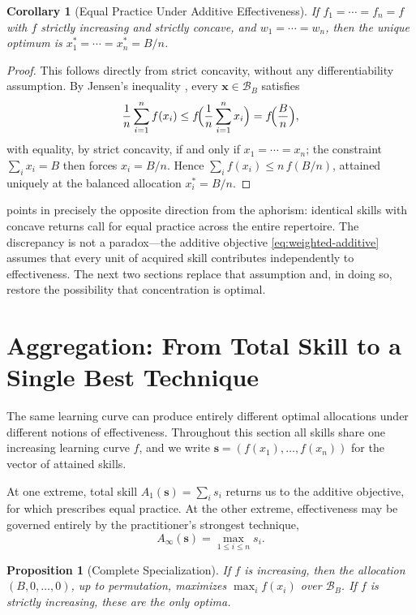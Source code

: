 \documentclass[11pt]{article}
\newtheorem{proposition}[theorem]{Proposition}
\newtheorem{corollary}[theorem]{Corollary}
\theoremstyle{definition}
\theoremstyle{remark}
\newcommand{\vx}{\mathbf{x}}
\newcommand{\vs}{\mathbf{s}}
\newcommand{\simplex}{\mathcal{B}}
\begin{document}
\begin{corollary}[Equal Practice Under Additive Effectiveness]
\label{cor:equal-practice}
If \(f_1=\cdots=f_n=f\) with \(f\) strictly increasing and strictly
concave, and \(w_1=\cdots=w_n\), then the unique optimum is
\(x_1^*=\cdots=x_n^*=B/n\).
\end{corollary}

\begin{proof}
This follows directly from strict concavity, without any
differentiability assumption.  By Jensen's inequality
\citep[\S3.1]{hardy1952inequalities}, every \(\vx\in\simplex_B\)
satisfies
\[
    \frac1n\sum_{i=1}^n f(x_i)
    \leq
    f\!\Bigl(\frac1n\sum_{i=1}^n x_i\Bigr)
    =
    f\!\Bigl(\frac{B}{n}\Bigr),
\]
with equality, by strict concavity, if and only if \(x_1=\cdots=x_n\);
the constraint \(\sum_i x_i=B\) then forces \(x_i=B/n\). Hence
\(\sum_i f(x_i)\leq n\,f(B/n)\), attained uniquely at the balanced
allocation \(x_i^*=B/n\).
\end{proof}

 points in precisely the opposite direction
from the aphorism: identical skills with concave returns call for
equal practice across the entire repertoire.  The discrepancy is not a
paradox---the additive objective \eqref{eq:weighted-additive} assumes
that every unit of acquired skill contributes independently to
effectiveness.  The next two sections replace that assumption and, in
doing so, restore the possibility that concentration is optimal.


\section{Aggregation: From Total Skill to a Single Best Technique}
\label{sec:aggregation}

The same learning curve can produce entirely different optimal
allocations under different notions of effectiveness.  Throughout this
section all skills share one increasing learning curve \(f\), and we
write \(\vs=(f(x_1),\ldots,f(x_n))\) for the vector of attained
skills.

At one extreme, total skill \(A_1(\vs)=\sum_i s_i\) returns us to the
additive objective, for which  prescribes
equal practice. At the other extreme, effectiveness may be governed
entirely by the practitioner's strongest technique,
\[
    A_\infty(\vs)=\max_{1\leq i\leq n} s_i.
\]

\begin{proposition}[Complete Specialization]
\label{prop:max-specialization}
If \(f\) is increasing, then the allocation \((B,0,\ldots,0)\), up to
permutation, maximizes \(\max_i f(x_i)\) over \(\simplex_B\). If \(f\)
is strictly increasing, these are the only optima.
\end{proposition}
\end{document}
